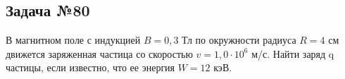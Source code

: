 \subsection{Задача №80}

 В магнитном поле с индукцией $B = 0,3$ Тл по окружности радиуса $R = 4$ см движется заряженная частица со скоростью $v = 1,0 \cdot 10^6$ м/с. Найти заряд q частицы, если известно, что ее энергия $W = 12$ кэВ.